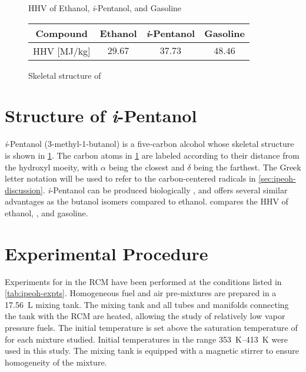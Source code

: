 \documentclass[../main.tex]{subfiles}
\begin{document}
\begin{figure}[!ht]\CenterFloatBoxes
    \begin{floatrow}
        \killfloatstyle\ttabbox
        {\captionsetup{type=table}\caption{HHV of Ethanol, \textit{i}-Pentanol, and Gasoline}
        \label{tab:ipeoh-heats}}
        {\begin{tabular}{*{4}{c}}
            \toprule
            Compound & Ethanol \cite{Afeefy2014} & \textit{i}-Pentanol \cite{Afeefy2014} & Gasoline \cite{Davis2013} \\
            \midrule
            HHV [\si[per-mode=symbol]{\mega\joule\per\kilo\gram}] & $29.67$ & $37.73$ & $48.46$ \\
            \bottomrule
        \end{tabular}}
            {\caption{Skeletal structure of \iPeOH{}}
            \label{fig:ipeoh-skeletal}}
    \end{floatrow}
\end{figure}

\section{Structure of \textit{i}-Pentanol}
\label{sec:ipeoh-struct}

\textit{i}-Pentanol (3-methyl-1-butanol) is a five-carbon alcohol whose
skeletal structure is shown in \cref{fig:ipeoh-skeletal}. The carbon
atoms in \cref{fig:ipeoh-skeletal} are labeled according to their
distance from the hydroxyl moeity, with $\alpha$ being the closest and
$\delta$ being the farthest. The Greek letter notation will be used to
refer to the carbon-centered radicals in \cref{sec:ipeoh-discussion}.
\textit{i}-Pentanol can be produced biologically \cite{Peralta-Yahya2012},
and offers several similar advantages as the butanol isomers compared
to ethanol.  compares the HHV of ethanol, \iPeOH{},
and gasoline.

\section{Experimental Procedure}
\label{sec:ipeoh-procedure}

Experiments for \iPeOH{} in the RCM have been performed at the conditions listed
in \cref{tab:ipeoh-expts}. Homogeneous fuel and air pre-mixtures are prepared in a
\SI{17.56}{\liter} mixing tank. The mixing tank and all tubes and manifolds
connecting the tank with the RCM are heated, allowing the study of
relatively low vapor pressure fuels. The initial temperature is set above
the saturation temperature of \iPeOH{} for each mixture studied. Initial
temperatures in the range \SIrange{353}{413}{\kelvin} were used in this
study. The mixing tank is equipped with a magnetic stirrer to ensure homogeneity
of the mixture.
\end{document}
